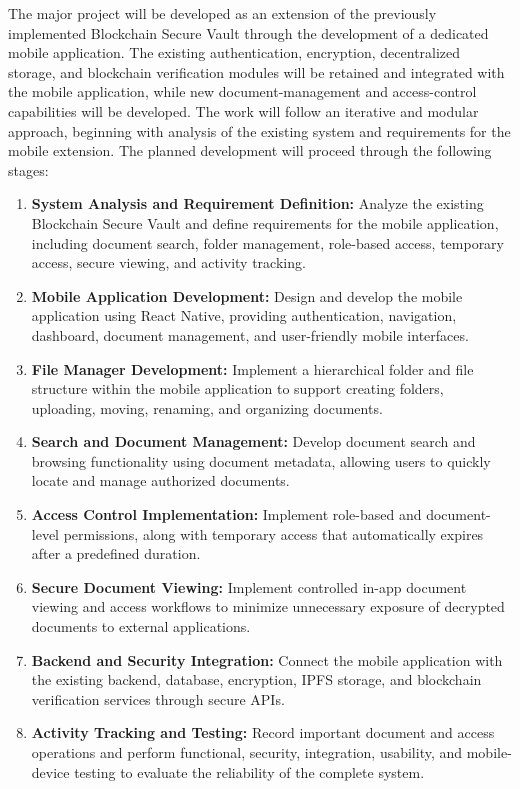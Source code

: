 \documentclass[12pt]{article}
\begin{document}
The major project will be developed as an extension of the previously implemented Blockchain Secure Vault through the development of a dedicated mobile application. The existing authentication, encryption, decentralized storage, and blockchain verification modules will be retained and integrated with the mobile application, while new document-management and access-control capabilities will be developed. The work will follow an iterative and modular approach, beginning with analysis of the existing system and requirements for the mobile extension. The planned development will proceed through the following stages:

\begin{enumerate}

\item \textbf{System Analysis and Requirement Definition:} Analyze the existing Blockchain Secure Vault and define requirements for the mobile application, including document search, folder management, role-based access, temporary access, secure viewing, and activity tracking.

\item \textbf{Mobile Application Development:} Design and develop the mobile application using React Native, providing authentication, navigation, dashboard, document management, and user-friendly mobile interfaces.

\item \textbf{File Manager Development:} Implement a hierarchical folder and file structure within the mobile application to support creating folders, uploading, moving, renaming, and organizing documents.

\item \textbf{Search and Document Management:} Develop document search and browsing functionality using document metadata, allowing users to quickly locate and manage authorized documents.

\item \textbf{Access Control Implementation:} Implement role-based and document-level permissions, along with temporary access that automatically expires after a predefined duration.

\item \textbf{Secure Document Viewing:} Implement controlled in-app document viewing and access workflows to minimize unnecessary exposure of decrypted documents to external applications.

\item \textbf{Backend and Security Integration:} Connect the mobile application with the existing backend, database, encryption, IPFS storage, and blockchain verification services through secure APIs.

\item \textbf{Activity Tracking and Testing:} Record important document and access operations and perform functional, security, integration, usability, and mobile-device testing to evaluate the reliability of the complete system.

\end{enumerate}
\end{document}
